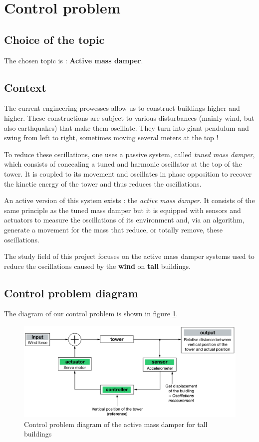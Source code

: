\section{Control problem}

\subsection{Choice of the topic}
The chosen topic is : {\bf Active mass damper}.

\subsection{Context}
The current engineering prowesses allow us to construct buildings higher and higher. These constructions are subject to various disturbances (mainly wind, but also earthquakes) that make them oscillate. They turn into giant pendulum and swing from left to right, sometimes moving several meters at the top ! \cite{YouTube_minutephysics}\par
To reduce these oscillations, one uses a passive system, called {\it tuned mass damper}, which consists of concealing a tuned and harmonic oscillator at the top of the tower. It is coupled to its movement and oscillates in phase opposition to recover the kinetic energy of the tower and thus reduces the oscillations. \cite{Wikipedia_amortisseur_tmd}\par
An active version of this system exists : the {\it active mass damper}. It consists of the same principle as the tuned mass damper but it is equipped with sensors and actuators to measure the oscillations of its environment and, via an algorithm, generate a movement for the mass that reduce, or totally remove, these oscillations. \cite{YANG201718}\par
The study field of this project focuses on the active mass damper systems used to reduce the oscillations caused by the {\bf wind} on {\bf tall} buildings.

\subsection{Control problem diagram}
The diagram of our control problem is shown in figure \ref{fig:diagram}.
\begin{figure}[!ht]
    \centering
    \includegraphics[width=1\textwidth]{resources/pdf/control-problem-diagram.pdf}
    \caption{Control problem diagram of the active mass damper for tall buildings}
    \label{fig:diagram}
\end{figure}

